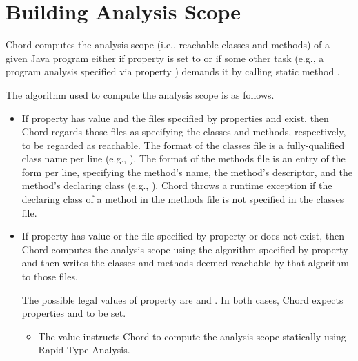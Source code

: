 \section{Building Analysis Scope}
\label{sec:building-scope}

Chord computes the analysis scope (i.e., reachable classes and methods) of a given Java program
either if property  is set to  or if some other task (e.g.,
a program analysis specified via property ) demands it by
calling static method .

The algorithm used to compute the analysis scope is as follows.

\begin{itemize}
\item
If property  has value  and the files specified by properties
 and  exist,
then Chord regards those files as specifying the classes and methods, respectively,
to be regarded as reachable.  The format
of the classes file is a fully-qualified class name per line (e.g., ).  The format
of the methods file is an entry of the form  per line,
specifying the method's name, the method's descriptor, and the method's declaring class
(e.g., \code{main:([Ljava/lang/String;)V@foo.bar.Main}).
Chord throws a runtime exception if the declaring class of a method in the methods file is not
specified in the classes file.

\item
If property  has value  or the file specified by
property  or  does not exist,
then Chord computes the analysis scope
using the algorithm specified by property  and then
writes the classes and methods deemed reachable by that algorithm to those files.

The possible legal values of property  are  and .
In both cases, Chord expects properties  and 
to be set.

\begin{itemize}
\item
The  value instructs Chord to compute the analysis scope statically using Rapid Type Analysis.


\end{itemize}
\end{itemize}
